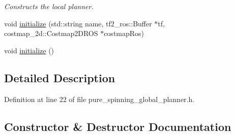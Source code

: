 \begin{DoxyCompactItemize}
\begin{DoxyCompactList}\small\item\em Constructs the local planner. \end{DoxyCompactList}\item 
void \hyperlink{classmove__base__z__client_1_1pure__spinning__global__planner_1_1PureSpinningGlobalPlanner_a8050cca93460b00a3ec391a98a25849a}{initialize} (std\+::string name, tf2\+\_\+ros\+::\+Buffer $\ast$tf, costmap\+\_\+2d\+::\+Costmap2\+D\+R\+OS $\ast$costmap\+Ros)
\item 
void \hyperlink{classmove__base__z__client_1_1pure__spinning__global__planner_1_1PureSpinningGlobalPlanner_aadd62d3fb2f062f821593f63b5a9bfaa}{initialize} ()
\end{DoxyCompactItemize}


\subsection{Detailed Description}


Definition at line 22 of file pure\+\_\+spinning\+\_\+global\+\_\+planner.\+h.



\subsection{Constructor \& Destructor Documentation}
